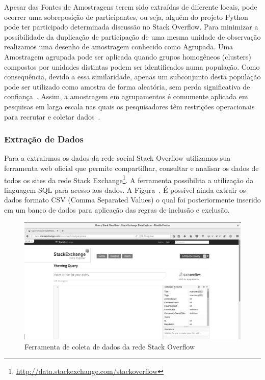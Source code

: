 Apesar das Fontes de Amostragens terem sido extraídas de diferente locais, pode
ocorrer uma sobreposição de participantes, ou seja, alguém do projeto Python
pode ter participado determinada discussão no Stack Overflow. Para minimizar a
possibilidade da duplicação de participação de uma mesma unidade de observação
realizamos uma  desenho de amostragem conhecido como Agrupada. Uma Amostragem
agrupada pode ser aplicada quando grupos homogêneos (clusters) compostos por
unidades distintas podem ser identificados numa população. Como consequência,
devido a essa similaridade, apenas um subconjunto desta população pode ser
utilizado como amostra de forma aleatória, sem perda significativa de
confiança~\cite{thompson2012sampling}. Assim, a amostragem em agrupamentos é
comumente aplicada em pesquisas em larga escala nas quais os pesquisadores têm
restrições operacionais para recrutar e coletar
dados~\cite{roberts2004mortality}.

\subsubsection{Extração de Dados}
\label{subsubsec:pesquisa_profissionais_extracao_dados}

Para a extrairmos os dados da rede social Stack Overflow utilizamos sua
ferramenta web oficial que permite compartilhar, consultar e analisar os dados
de todos os sites da rede Stack
Exchange\footnote{\url{http://data.stackexchange.com/stackoverflow}}. A
ferramenta possibilita a utilização da linguagem SQL para acesso aos dados. A
Figura~\cite{fig:stack-exchange}. É possível ainda extrair os dados formato CSV
(Comma Separated Values) o qual foi posteriormente inserido em um banco de dados
para aplicação das regras de inclusão e exclusão.

\begin{figure}[htpb]
	\centering
	\includegraphics[width=0.8\linewidth]{./chapter-pesquisa-com-profissionais/img/stack-exchange.png}
	\caption{Ferramenta de coleta de dados da rede Stack Overflow}
\label{fig:stack-exchange}
\end{figure}

